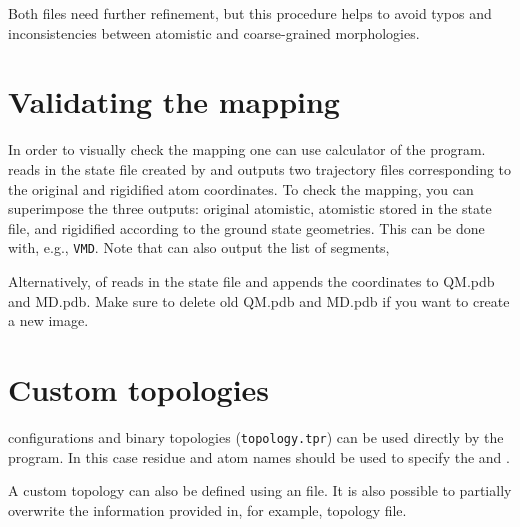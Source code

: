 Both files need further refinement, but this procedure helps to avoid typos and inconsistencies between atomistic and coarse-grained morphologies.


\section{Validating the mapping}
\label{sec:ctp_dump}
In order to visually check the mapping one can use calculator  of the \ctpdump program.
%
%
\ctpdump reads in the state file created by \ctpmap and outputs two trajectory files corresponding to the original and rigidified atom coordinates. To check the mapping, you can superimpose the three outputs: original atomistic, atomistic stored in the state file, and rigidified according to the ground state geometries. This can be done with, e.g., {\tt VMD}. Note that \ctpdump can also output the list of segments, 

Alternatively,  of \ctprun reads in the state file and appends the coordinates to QM.pdb and MD.pdb. Make sure to delete old QM.pdb and MD.pdb if you want to create a new image.
\label{sec:tdump}




\section{Custom topologies}

\gromacs configurations and binary topologies (\texttt{topology.tpr}) can be used directly by the \ctpmap program. In this case residue and atom names should be used to specify the  and . 

A custom topology can also be defined using an \xml file. It is also possible to partially overwrite the information provided in, for example, \gromacs topology file. 

